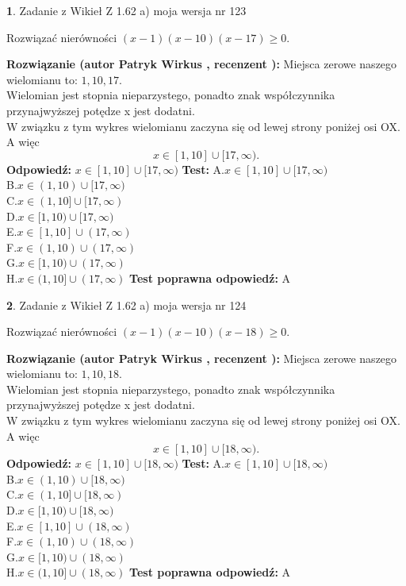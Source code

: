 \documentclass[12pt, a4paper]{article}
\theoremstyle{definition} %
\newtheorem{zad}{}
\newcommand{\zadStart}[1]{\begin{zad}#1\newline}
\newcommand{\zadStop}{\end{zad}}
\newcommand{\rozwStart}[2]{\noindent \textbf{Rozwiązanie (autor #1 , recenzent #2): }\newline}
\newcommand{\rozwStop}{\newline}
\newcommand{\odpStart}{\noindent \textbf{Odpowiedź:}\newline}
\newcommand{\odpStop}{\newline}
\newcommand{\testStart}{\noindent \textbf{Test:}\newline}
\newcommand{\testStop}{\newline}
\newcommand{\kluczStart}{\noindent \textbf{Test poprawna odpowiedź:}\newline}
\newcommand{\kluczStop}{\newline}
\begin{document}
\zadStart{Zadanie z Wikieł Z 1.62 a) moja wersja nr 123}

Rozwiązać nierówności $(x-1)(x-10)(x-17)\ge0$.
\zadStop
\rozwStart{Patryk Wirkus}{}
Miejsca zerowe naszego wielomianu to: $1, 10, 17$.\\
Wielomian jest stopnia nieparzystego, ponadto znak współczynnika przy\linebreak najwyższej potędze x jest dodatni.\\ W związku z tym wykres wielomianu zaczyna się od lewej strony poniżej osi OX. A więc $$x \in [1,10] \cup [17,\infty).$$
\rozwStop
\odpStart
$x \in [1,10] \cup [17,\infty)$
\odpStop
\testStart
A.$x \in [1,10] \cup [17,\infty)$\\
B.$x \in (1,10) \cup [17,\infty)$\\
C.$x \in (1,10] \cup [17,\infty)$\\
D.$x \in [1,10) \cup [17,\infty)$\\
E.$x \in [1,10] \cup (17,\infty)$\\
F.$x \in (1,10) \cup (17,\infty)$\\
G.$x \in [1,10) \cup (17,\infty)$\\
H.$x \in (1,10] \cup (17,\infty)$
\testStop
\kluczStart
A
\kluczStop



\zadStart{Zadanie z Wikieł Z 1.62 a) moja wersja nr 124}

Rozwiązać nierówności $(x-1)(x-10)(x-18)\ge0$.
\zadStop
\rozwStart{Patryk Wirkus}{}
Miejsca zerowe naszego wielomianu to: $1, 10, 18$.\\
Wielomian jest stopnia nieparzystego, ponadto znak współczynnika przy\linebreak najwyższej potędze x jest dodatni.\\ W związku z tym wykres wielomianu zaczyna się od lewej strony poniżej osi OX. A więc $$x \in [1,10] \cup [18,\infty).$$
\rozwStop
\odpStart
$x \in [1,10] \cup [18,\infty)$
\odpStop
\testStart
A.$x \in [1,10] \cup [18,\infty)$\\
B.$x \in (1,10) \cup [18,\infty)$\\
C.$x \in (1,10] \cup [18,\infty)$\\
D.$x \in [1,10) \cup [18,\infty)$\\
E.$x \in [1,10] \cup (18,\infty)$\\
F.$x \in (1,10) \cup (18,\infty)$\\
G.$x \in [1,10) \cup (18,\infty)$\\
H.$x \in (1,10] \cup (18,\infty)$
\testStop
\kluczStart
A
\kluczStop
\end{document}
